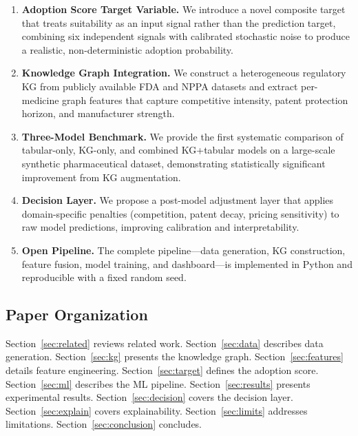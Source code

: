 \documentclass[10pt,journal,compsoc]{IEEEtran}
\begin{document}
\begin{enumerate}
  \item \textbf{Adoption Score Target Variable.}
        We introduce a novel composite target that treats suitability as an input
        signal rather than the prediction target, combining six independent signals
        with calibrated stochastic noise to produce a realistic, non-deterministic
        adoption probability.

  \item \textbf{Knowledge Graph Integration.}
        We construct a heterogeneous regulatory KG from publicly available FDA and
        NPPA datasets and extract per-medicine graph features that capture competitive
        intensity, patent protection horizon, and manufacturer strength.

  \item \textbf{Three-Model Benchmark.}
        We provide the first systematic comparison of tabular-only, KG-only, and
        combined KG+tabular models on a large-scale synthetic pharmaceutical dataset,
        demonstrating statistically significant improvement from KG augmentation.

  \item \textbf{Decision Layer.}
        We propose a post-model adjustment layer that applies domain-specific penalties
        (competition, patent decay, pricing sensitivity) to raw model predictions,
        improving calibration and interpretability.

  \item \textbf{Open Pipeline.}
        The complete pipeline---data generation, KG construction, feature fusion,
        model training, and dashboard---is implemented in Python and reproducible
        with a fixed random seed.
\end{enumerate}

\subsection{Paper Organization}

Section~\ref{sec:related} reviews related work.
Section~\ref{sec:data} describes data generation.
Section~\ref{sec:kg} presents the knowledge graph.
Section~\ref{sec:features} details feature engineering.
Section~\ref{sec:target} defines the adoption score.
Section~\ref{sec:ml} describes the ML pipeline.
Section~\ref{sec:results} presents experimental results.
Section~\ref{sec:decision} covers the decision layer.
Section~\ref{sec:explain} covers explainability.
Section~\ref{sec:limits} addresses limitations.
Section~\ref{sec:conclusion} concludes.
\end{document}
